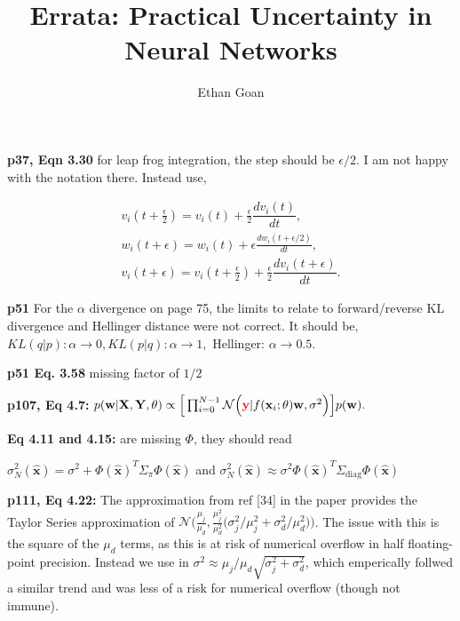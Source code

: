 \documentclass{article}
\title{{\titlefont Errata: Practical Uncertainty in Neural Networks}}
\author{{\authorfont Ethan Goan}}
\date{} %
\begin{document}
\maketitle
\thispagestyle{fancy} %

\textbf{p37, Eqn 3.30} for leap frog integration, the step should be $\epsilon/2$. I am not happy with the notation there. Instead use,

\begin{align*}
  v_i(t + \frac{\epsilon}{2}) = v_i(t) + \frac{\epsilon}{2} \dfrac{dv_{i}(t)}{dt},
  \\
  w_i(t + \epsilon) = w_i(t) + \epsilon \frac{dw_{i}(t + \epsilon /2)}{dt},
  \\
  v_i(t + \epsilon) = v_i(t +\frac{\epsilon}{2}) + \frac{\epsilon}{2} \dfrac{dv_{i}(t + \epsilon)}{dt}.
\end{align*}


\textbf{p51} For the $\alpha$ divergence on page 75, the limits to relate to forward/reverse KL divergence and Hellinger distance were not correct. It should be, $KL(q|p): \alpha \rightarrow 0, KL(p|q): \alpha \rightarrow 1,$ Hellinger: $ \alpha \rightarrow 0.5$.

\textbf{p51 Eq. 3.58} missing factor of $1/2$


\textbf{p107, Eq 4.7:}  $ p(\mathbf{w} | \mathbf{X}, \mathbf{Y} , \theta ) \propto \Big[\prod_{i=0}^{N-1}\mathcal{N}\Big({\color{red}\mathbf{y}}|f(\mathbf{x}_{i};\theta) \mathbf{w}, \sigma^{2}\Big)\Big] p(\mathbf{w}).$

\textbf{Eq 4.11 and 4.15:} are missing $\Phi$, they should read

$\sigma^{2}_{N}(\hat{\mathbf{x}}) =
\sigma^{2} + \Phi(\hat{\mathbf{x}})^{T}\Sigma_{\pi} \Phi(\hat{\mathbf{x}})$ and
$\sigma^{2}_{N}(\hat{\mathbf{x}}) \approx \sigma^{2}
\Phi(\hat{\mathbf{x}})^{T}\Sigma_{\text{diag}} \Phi(\hat{\mathbf{x}})$

\textbf{p111, Eq 4.22:} The approximation from ref [34] in the paper provides the Taylor Series approximation of
$ \mathcal{N}\Big(\frac{\mu_{j}}{\mu_{d}},\frac{\mu_{j}^{2}}{\mu_{d}^{2}}\big(\sigma^{2}_{j} / \mu_{j}^{2} +  \sigma^{2}_{d} / \mu_{d}^{2} \big)\Big)$. The issue with this is the square of the $\mu_{d}$ terms, as this is at risk of numerical overflow in half floating-point precision. Instead we use in $\sigma^{2} \approx \mu_{j} / \mu_{d}\sqrt{\sigma^{2}_{j} + \sigma^{2}_{d}}$, which emperically follwed a similar trend and was less of a risk for numerical overflow (though not immune).
\end{document}
